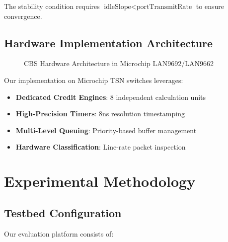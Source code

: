 \documentclass[10pt, journal, compsoc]{IEEEtran}
\begin{document}
The stability condition requires $\text{idleSlope} < \text{portTransmitRate}$ to ensure convergence.

\subsection{Hardware Implementation Architecture}

\begin{figure}[H]
\centering
{}
\caption{CBS Hardware Architecture in Microchip LAN9692/LAN9662}
\label{fig:cbs_hw_arch}
\end{figure}

Our implementation on Microchip TSN switches leverages:

\begin{itemize}
    \item \textbf{Dedicated Credit Engines}: 8 independent calculation units
    \item \textbf{High-Precision Timers}: 8ns resolution timestamping
    \item \textbf{Multi-Level Queuing}: Priority-based buffer management
    \item \textbf{Hardware Classification}: Line-rate packet inspection
\end{itemize}

\section{Experimental Methodology}

\subsection{Testbed Configuration}

Our evaluation platform consists of:
\end{document}
